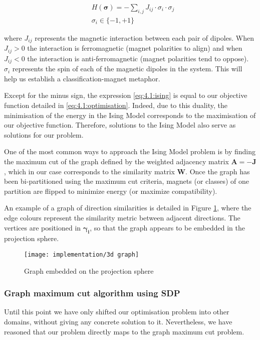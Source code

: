 \documentclass[../main.tex]{subfiles}
\begin{document}
\begin{equation}\label{eq:4.1:ising}
\begin{aligned}
    & H(\bm{\sigma}) = -\sum_{i, j} J_{ij} \cdot \sigma_i \cdot \sigma_j\\
    & \sigma_i \in \{-1, +1\}
\end{aligned}
\end{equation}

where $J_{ij}$ represents the magnetic interaction between each pair of dipoles. When $J_{ij} > 0$ the interaction is ferromagnetic (magnet polarities to align) and when $J_{ij} < 0$ the interaction is anti-ferromagnetic (magnet polarities tend to oppose). $\sigma_i$ represents the spin of each of the magnetic dipoles in the system. This will help us establish a classification-magnet metaphor.

Except for the minus sign, the expression \eqref{eq:4.1:ising} is equal to our objective function detailed in \eqref{eq:4.1:optimisation}. Indeed, due to this duality, the minimisation of the energy in the Ising Model corresponds to the maximisation of our objective function. Therefore, solutions to the Ising Model also serve as solutions for our problem. 

One of the most common ways to approach the Ising Model problem is by finding the maximum cut of the graph defined by the weighted adjacency matrix $\bm{A} = -\bm{J}$, which in our case corresponds to the similarity matrix $\bm{W}$. Once the graph has been bi-partitioned using the maximum cut criteria, magnets (or classes) of one partition are flipped to minimize energy (or maximize compatibility)\cite{kennedy2008}.

An example of a graph of direction similarities is detailed in Figure \ref{fig:4.1:graph}, where the edge colours represent the similarity metric between adjacent directions. The vertices are positioned in $\bm{\gamma_i}$, so that the graph appears to be embedded in the projection sphere.

\begin{figure}[hbp]
    \centering
    \texttt{[image: implementation/3d graph]}
    \caption{Graph embedded on the projection sphere}
    \label{fig:4.1:graph}
\end{figure}

\subsubsection{Graph maximum cut algorithm using SDP}
Until this point we have only shifted our optimisation problem into other domains, without giving any concrete solution to it. Nevertheless, we have reasoned that our problem directly maps to the graph maximum cut problem.
\end{document}
